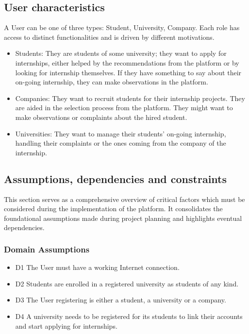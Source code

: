 \documentclass{article}
\begin{document}
\subsection{User characteristics}
     A User can be one of three types: Student, University, Company. Each role has access to distinct functionalities and is driven by different motivations.
     \begin{itemize}
        \item Students: They are students of some university; they want to apply for internships, either helped by the recommendations from the platform or by looking for internship themselves. If they have something to say about their on-going internship, they can make observations in the platform.
        \item Companies: They want to recruit students for their internship projects. They are aided in the selection process from the platform. They might want to make observations or complaints about the hired student.
        \item Universities: They want to manage their students' on-going internship, handling their complaints or the ones coming from the company of the internship.     
     \end{itemize}
\subsection{Assumptions, dependencies and constraints}
This section serves as a comprehensive overview of critical factors which must be considered during the implementation of the platform. It consolidates the foundational assumptions made during project planning and highlights eventual dependencies.
\subsubsection{Domain Assumptions}
    \begin{itemize}
        \item D1 The User must have a working Internet connection.
        \item D2 Students are enrolled in a registered university as students of any kind.
        \item D3 The User registering is either a student, a university or a company.
        \item D4 A university needs to be registered for its students to link their accounts and start applying for internships.

    \end{itemize}
\end{document}
